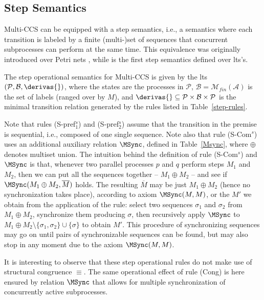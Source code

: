 \subsection{Step Semantics}

Multi-CCS can be equipped with a step semantics, i.e., a semantics where each transition is labeled by a finite (multi-)set of 
sequences that concurrent subprocesses can perform at the same time. This equivalence was originally introduced 
over Petri nets \cite{NT84}, while \cite{Mil85} is the first step semantics
defined over lts's.

The  step operational semantics for Multi-CCS is given by the lts 
$({\mathcal P},{\mathcal B}, \derivas{ })$, where the states are the processes
in ${\mathcal P}$, ${\mathcal B} = {\mathcal M}_{fin}({\mathcal A})$ 
is the set of labels (ranged over by $M$),
and $\derivas{ } \subseteq {\mathcal P}\times{\mathcal B}\times{\mathcal P}$ is the minimal 
transition relation generated by the rules listed in Table~\ref{step-rules}. 

Note that rules (S-pref$_1^s$) and (S-pref$_2^s$) assume that the transition in the premise 
is sequential, i.e., composed of one single sequence. Note also that rule (S-Com$^s$)
uses an additional auxiliary relation $\MSync$, defined in Table~\ref{Msync}, where $\oplus$ denotes multiset union.
The intuition behind the definition of rule (S-Com$^s$) and $\MSync$ is that, whenever two parallel processes 
$p$ and $q$ perform steps $M_1$ and $M_2$, then we can put all the sequences together -- $M_1 \oplus M_2$ --
and see if $\MSync(M_1 \oplus M_2, \overline{M})$ holds. The resulting $\overline{M}$ may be just 
$M_1 \oplus M_2$ (hence no synchronization takes place), according to axiom $\MSync(M, M)$, 
or the $M'$ we obtain from the application of the rule:
select two sequences $\sigma_1$ and $\sigma_2$ from $M_1 \oplus M_2$, synchronize them producing $\sigma$,
then recursively apply $\MSync$ to $M_1 \oplus M_2 \setminus \{\sigma_1, \sigma_2\} \cup \{\sigma\}$ to obtain $M'$.
This procedure of synchronizing sequences may go on until pairs of synchronizable sequences can be found, 
but may also stop in any moment due to the axiom $\MSync(M, M)$.

It is interesting to observe that these step operational rules do not make use of structural congruence $\equiv$. The same
operational effect of rule (Cong) is here ensured by relation $\MSync$ that allows for multiple synchronization 
of concurrently active subprocesses. 


